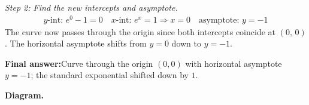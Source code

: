 \documentclass[11pt]{article}
\begin{document}
\textit{Step 2: Find the new intercepts and asymptote.}
\[\begin{gathered}
y\text{-int: } e^{0} - 1 = 0 \quad x\text{-int: } e^{x} = 1 \Rightarrow x = 0 \quad \text{asymptote: } y = -1
\end{gathered}\]
The curve now passes through the origin since both intercepts coincide at \( (0,\,0) \). The horizontal asymptote shifts from \( y = 0 \) down to \( y = -1 \).

\begin{answerbox}
\textbf{Final answer:}\quad Curve through the origin \(\displaystyle (0, 0)\) with horizontal asymptote \(\displaystyle  y = -1 \); the standard exponential shifted down by \(\displaystyle  1 \).
\end{answerbox}
\textbf{Diagram.}

\begin{center}
\end{center}
\end{document}
